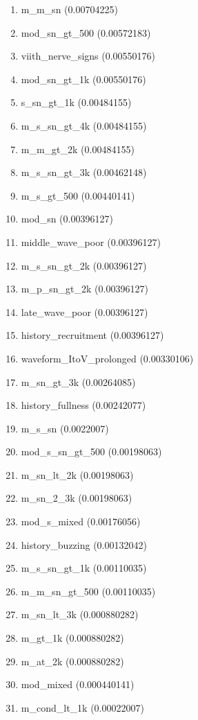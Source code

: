 \begin{enumerate}
\item m\_m\_sn (0.00704225)
\item mod\_sn\_gt\_500 (0.00572183)
\item viith\_nerve\_signs (0.00550176)
\item mod\_sn\_gt\_1k (0.00550176)
\item s\_sn\_gt\_1k (0.00484155)
\item m\_s\_sn\_gt\_4k (0.00484155)
\item m\_m\_gt\_2k (0.00484155)
\item m\_s\_sn\_gt\_3k (0.00462148)
\item m\_s\_gt\_500 (0.00440141)
\item mod\_sn (0.00396127)
\item middle\_wave\_poor (0.00396127)
\item m\_s\_sn\_gt\_2k (0.00396127)
\item m\_p\_sn\_gt\_2k (0.00396127)
\item late\_wave\_poor (0.00396127)
\item history\_recruitment (0.00396127)
\item waveform\_ItoV\_prolonged (0.00330106)
\item m\_sn\_gt\_3k (0.00264085)
\item history\_fullness (0.00242077)
\item m\_s\_sn (0.0022007)
\item mod\_s\_sn\_gt\_500 (0.00198063)
\item m\_sn\_lt\_2k (0.00198063)
\item m\_sn\_2\_3k (0.00198063)
\item mod\_s\_mixed (0.00176056)
\item history\_buzzing (0.00132042)
\item m\_s\_sn\_gt\_1k (0.00110035)
\item m\_m\_sn\_gt\_500 (0.00110035)
\item m\_sn\_lt\_3k (0.000880282)
\item m\_gt\_1k (0.000880282)
\item m\_at\_2k (0.000880282)
\item mod\_mixed (0.000440141)
\item m\_cond\_lt\_1k (0.00022007)
\end{enumerate}